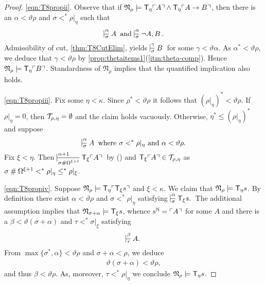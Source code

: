\documentclass[UKenglish,cleveref,DIV=12]{scrartcl}
\theoremstyle{definition}
\theoremstyle{definition}
\begin{document}
\begin{proof}

\ref{eqn:T8propii}. Observe that if $\mathfrak N_\rho\models \mathsf{T}_\eta \ulcorner{A}\urcorner \land \mathsf{T}_\eta \ulcorner{A\rightarrow B}\urcorner$, then there is an $\alpha<\vartheta\rho$ and $\sigma <^* \rho|_\eta$ such that
\[
 \prov{\alpha}\sigma{A}\text{ and }\prov{\alpha}\sigma{\lnot A,B}.
\]
Admissibility of cut, \cref{thm:T8CutElim}, yields $\prov{\gamma}\sigma{B}$ for some $\gamma < \vartheta \alpha$.
As \( \alpha^* < \vartheta \rho \), we deduce that \( \gamma < \vartheta \rho \) by \cref{prop:thetaitems1}(\ref{itm:theta-comp}).
Hence $\mathfrak N_\rho\models \mathsf{T}_\eta \ulcorner{B}\urcorner$.
Standardness of \( \mathfrak N_\rho \) implies that the quantified implication also holds.

\ref{eqn:T8propiii}. Fix some $\eta<\kappa$. Since \( \rho^* < \vartheta \rho \) it follows that $(\rho|_\eta)^*<\vartheta\rho$. 
If $\rho|_\eta=0$, then \( \mathcal{T}_{\rho,\eta} = \emptyset \) and the claim holds vacuously.  
Otherwise, $\eta^*\le(\rho|_\eta)^*$ and suppose 
\[ \prov\alpha\sigma A \text{ where $\sigma <^* \rho|_\eta$ and $\alpha < \vartheta\rho$.}
\]
Fix \( \xi < \eta \).
Then \( \prov {\alpha+1}{ \sigma \nsum \Omega^{\xi+1} } {\T_\xi\gn A } \) by (\Nec\xi) and ${\mathsf{T}_\xi \ulcorner{A}\urcorner } \in \mathcal{T}_{\rho,\eta}$ as \( \sigma \mathbin{\#} \Omega^{\xi+1} <^* \rho|_\eta \le^* \rho|_\xi \).

\ref{eqn:T8propiv}. Suppose $ \mathfrak N_\rho\models \mathsf{T}_\eta \ulcorner{\mathsf{T}_\xi s}\urcorner $ and $\xi<\kappa$.
We claim that $\mathfrak N_\rho\models \mathsf{T}_\eta s$. 
By definition there exist $\alpha < \vartheta \rho $ and $\sigma <^* \rho|_\eta$ satisfying 
\(
 \prov{\alpha}{\sigma}{\T_\xi s.}
\)
The additional assumption implies that $\mathfrak N_{\sigma+\alpha}\models \mathsf{T}_\xi s$, whence $s^\mathbb N=\ulcorner{A}\urcorner$ for some $A$ and there is a $\beta < \vartheta( \sigma + \alpha) $ and $\tau <^* \sigma|_\xi$ satisfying
\[
	\prov\beta\tau {A.}
\]
From $\max\{ \sigma^*,\alpha \} <\vartheta\rho$ and $\sigma+\alpha<\rho$, we deduce
\begin{align*}
  \vartheta(\sigma+\alpha)< \vartheta\rho,
\end{align*}
and thus $ \beta < \vartheta\rho$. As, moreover, $\tau <^* \rho|_\eta$ we conclude $\mathfrak N_\rho\models \mathsf{T}_\eta s$.



\end{proof}
\end{document}
